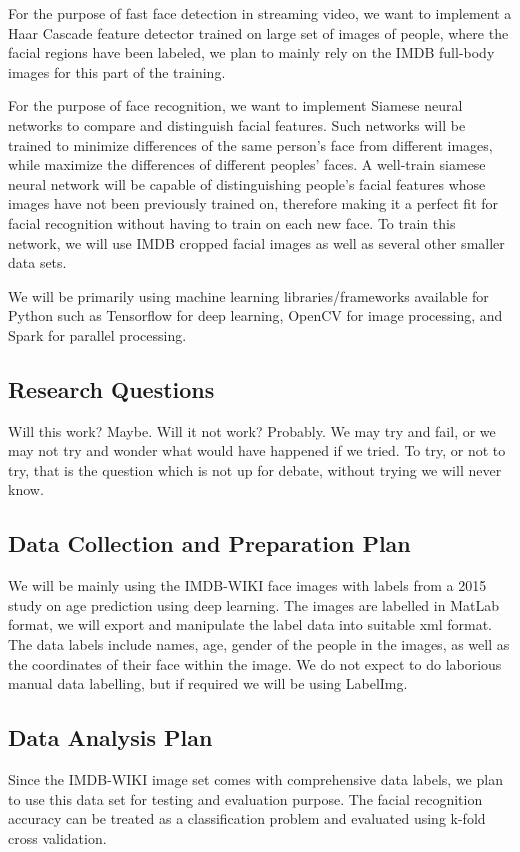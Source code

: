 \documentclass[conference]{IEEEtran}
\begin{document}
For the purpose of fast face detection in streaming video, we want to implement a Haar Cascade feature detector trained on large set of images of people, where the facial regions have been labeled, we plan to mainly rely on the IMDB full-body images for this part of the training.

For the purpose of face recognition, we want to implement Siamese neural networks to compare and distinguish facial features. Such networks will be trained to minimize differences of the same person's face from different images, while maximize the differences of different peoples' faces. A well-train siamese neural network will be capable of distinguishing people's facial features whose images have not been previously trained on, therefore making it a perfect fit for facial recognition without having to train on each new face. To train this network, we will use IMDB cropped facial images as well as several other smaller data sets.

We will be primarily using machine learning libraries/frameworks available for Python such as Tensorflow for deep learning, OpenCV for image processing, and Spark for parallel processing.

\subsection{Research Questions}
Will this work? Maybe. Will it not work? Probably. We may try and fail, or we may not try and wonder what would have happened if we tried. To try, or not to try, that is the question which is not up for debate, without trying we will never know.

\subsection{Data Collection and Preparation Plan}
We will be mainly using the IMDB-WIKI face images with labels from a 2015 study on age prediction using deep learning. The images are labelled in MatLab format, we will export and manipulate the label data into suitable xml format. The data labels include names, age, gender of the people in the images, as well as the coordinates of their face within the image. We do not expect to do laborious manual data labelling, but if required we will be using LabelImg.

\subsection{Data Analysis Plan}
Since the IMDB-WIKI image set comes with comprehensive data labels, we plan to use this data set for testing and evaluation purpose. The facial recognition accuracy can be treated as a classification problem and evaluated using k-fold cross validation.
\end{document}
